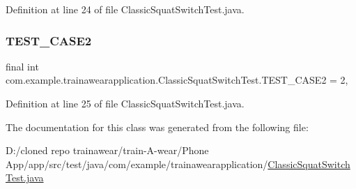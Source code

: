 Definition at line 24 of file Classic\+Squat\+Switch\+Test.\+java.

\mbox{\label{classcom_1_1example_1_1trainawearapplication_1_1_classic_squat_switch_test_adfafc37af9e307475f809327d404008d}} 
\subsubsection{\texorpdfstring{TEST\_CASE2}{TEST\_CASE2}}
{\footnotesize\ttfamily final int com.\+example.\+trainawearapplication.\+Classic\+Squat\+Switch\+Test.\+T\+E\+S\+T\+\_\+\+C\+A\+S\+E2 = 2\hspace{0.3cm}{\ttfamily [static]}, {\ttfamily [private]}}



Definition at line 25 of file Classic\+Squat\+Switch\+Test.\+java.



The documentation for this class was generated from the following file\+:\begin{DoxyCompactItemize}
\item 
D\+:/cloned repo trainawear/train-\/\+A-\/wear/\+Phone App/app/src/test/java/com/example/trainawearapplication/\mbox{\hyperlink{_classic_squat_switch_test_8java}{Classic\+Squat\+Switch\+Test.\+java}}\end{DoxyCompactItemize}
